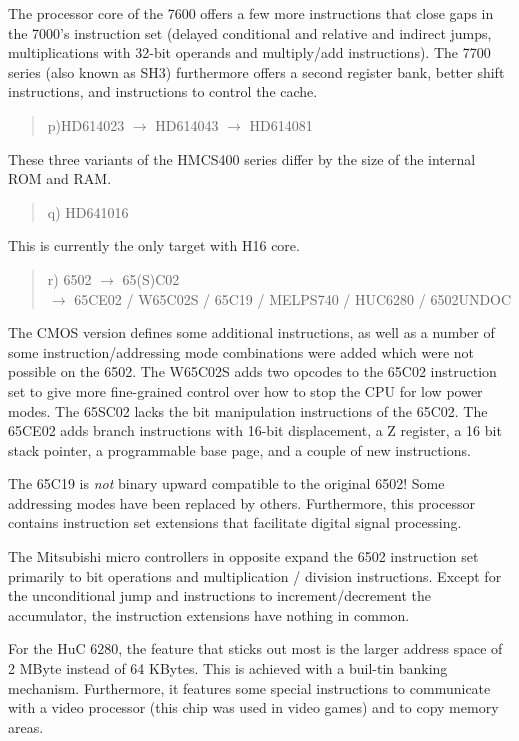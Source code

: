 \documentclass[12pt,twoside]{report}
\begin{document}
The processor core of the 7600 offers a few more instructions that
close gaps in the 7000's instruction set (delayed conditional and
relative and indirect jumps, multiplications with 32-bit operands and
multiply/add instructions).  The 7700 series (also known as SH3)
furthermore offers a second register bank, better shift instructions, and
instructions to control the cache.
\begin{quote}
p)HD614023 $\longrightarrow$ HD614043 $\longrightarrow$ HD614081
\end{quote}
These three variants of the HMCS400 series differ by the size of
the internal ROM and RAM.
\begin{quote}
q) HD641016
\end{quote}
This is currently the only target with H16 core.
\begin{quote}
r) 6502 $\rightarrow$ 65(S)C02 \\
   $\rightarrow$ 65CE02 / W65C02S / 65C19 / MELPS740 / HUC6280 / 6502UNDOC
\end{quote}
The CMOS version defines some additional instructions, as well as a number of
some instruction/addressing mode combinations were added which were not
possible on the 6502.  The W65C02S adds two opcodes to the 65C02 instruction
set to give more fine-grained control over how to stop the CPU for low power
modes.  The 65SC02 lacks the bit manipulation instructions of the
65C02.  The 65CE02 adds branch instructions with 16-bit displacement, a Z
register, a 16 bit stack pointer, a programmable base page, and a couple of
new instructions.

The 65C19 is {\em not} binary upward compatible to the original
6502! Some addressing modes have been replaced by others.
Furthermore, this processor contains instruction set extensions
that facilitate digital signal processing.

The Mitsubishi micro controllers in opposite expand
the 6502 instruction set primarily to bit operations and multiplication /
division instructions.  Except for the unconditional jump and instructions
to increment/decrement the accumulator, the instruction extensions
have nothing in common.

For the HuC 6280, the feature that sticks out most is the larger
address space of 2 MByte instead of 64 KBytes.  This is achieved
with a buil-tin banking mechanism.  Furthermore, it features some
special instructions to communicate with a video processor (this
chip was used in video games) and to copy memory areas.
\end{document}
